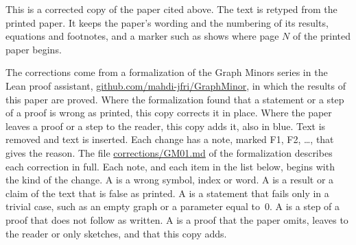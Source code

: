 
This is a corrected copy of the paper cited above. The text is retyped from the printed paper.
It keeps the paper's wording and the numbering of its results, equations and footnotes, and a
marker such as  shows where page $N$ of the printed paper begins.

The corrections come from a formalization of the Graph Minors series in the Lean proof
assistant, \href{https://github.com/mahdi-jfri/GraphMinor}{github.com/mahdi-jfri/GraphMinor},
in which the results of this paper are proved. Where the formalization found that a statement
or a step of a proof is wrong as printed, this copy corrects it in place. Where the paper leaves a proof or a step to the reader, this copy adds it, also in blue. Text  is removed and text  is inserted. Each change has a note, marked
\textcolor{fixcolor}{\sffamily F1}, \textcolor{fixcolor}{\sffamily F2}, \dots, that gives the
reason. The file
\href{https://github.com/mahdi-jfri/GraphMinor/blob/main/corrections/GM01.md}{corrections/GM01.md}
of the formalization describes each correction in full. Each note, and each item in the list below, begins with the kind of the change. A  is a wrong symbol, index or word. A  is a result or a claim of the text that is false as printed. A  is a statement that fails only in a trivial case, such as an empty graph or a parameter equal to~$0$. A  is a step of a proof that does not follow as written. A  is a proof that the paper omits, leaves to the reader or only sketches, and that this copy adds.

